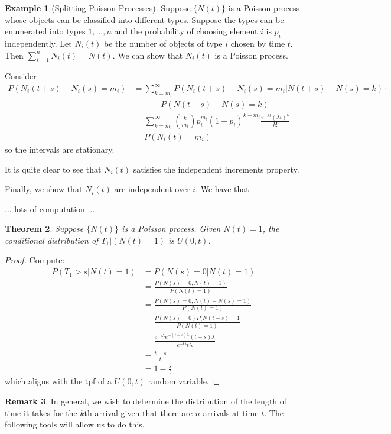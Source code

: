 \documentclass[11pt]{amsart}
\newtheorem{theorem}{Theorem}[section]
\theoremstyle{definition}
\newtheorem{remark}[theorem]{Remark}
\newtheorem{example}[theorem]{Example}
\numberwithin{equation}{section}
\begin{document}
 \begin{example}[Splitting Poisson Processes]
     Suppose $\{N(t)\}$ is a Poisson process whose objects can be classified into different types. Suppose the types can be enumerated into types $1,\ldots,n$ and the probability of choosing element $i$ is $p_i$ independently. Let $N_i(t)$ be the number of objects of type $i$ chosen by time $t$. Then $\sum_{i=1}^nN_i(t)=N(t)$. We can show that $N_i(t)$ is a Poisson process.

     Consider 
     \begin{align*}
         P(N_i(t+s)-N_i(s)=m_i)&=\sum_{k=m_i}^\infty P(N_i(t+s)-N_i(s)=m_i|N(t+s)-N(s)=k)\cdot\\&\hspace{40pt}P(N(t+s)-N(s)=k)\\
         &=\sum_{k=m_i}^\infty \binom{k}{m_i}p_i^{m_i}(1-p_i)^{k-m_i}\frac{e^{-\lambda t}(\lambda t)^k}{k!}\\
         &=P(N_i(t)=m_i)
     \end{align*}
     so the intervals are stationary. 

     It is quite clear to see that $N_i(t)$ satisfies the independent increments property. 

     Finally, we show that $N_i(t)$ are independent over $i$. We have that
     
     ... lots of computation ...
 \end{example}
 \begin{theorem}
     Suppose $\{N(t)\}$ is a Poisson process. Given $N(t)=1$, the conditional distribution of $T_1|(N(t)=1)$ is $U(0,t)$.
 \end{theorem}
 \begin{proof}
     Compute:
     \begin{align*}
         P(T_1>s|N(t)=1)&=P(N(s)=0|N(t)=1)\\
         &=\frac{P(N(s)=0,N(t)=1)}{P(N(t)=1)}\\
         &=\frac{P(N(s)=0,N(t)-N(s)=1)}{P(N(t)=1)}\\
         &=\frac{P(N(s)=0)P(N(t-s)=1}{P(N(t)=1)}\\
         &=\frac{e^{-s\lambda}e^{-(t-s)\lambda}(t-s)\lambda}{e^{-t\lambda}t\lambda}\\
         &=\frac{t-s}{t}\\
         &=1-\frac{s}{t}
     \end{align*}
     which aligns with the tpf of a $U(0,t)$ random variable.
 \end{proof}
 \begin{remark}
     In general, we wish to determine the distribution of the length of time it takes for the $k$th arrival given that there are $n$ arrivals at time $t$. The following tools will allow us to do this.
 \end{remark}
\end{document}
